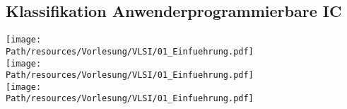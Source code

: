 \subsection{Klassifikation Anwenderprogrammierbare IC}
	\begin{center}
	\texttt{[image: \\Path/resources/Vorlesung/VLSI/01\_Einfuehrung.pdf]}
	\\\texttt{[image: \\Path/resources/Vorlesung/VLSI/01\_Einfuehrung.pdf]}
	\\\texttt{[image: \\Path/resources/Vorlesung/VLSI/01\_Einfuehrung.pdf]}
	\end{center}

\newpage
